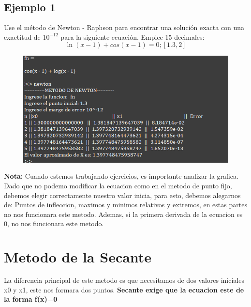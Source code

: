 \documentclass{article}
\theoremstyle{mytheoremstyle}
\theoremstyle{mytheoremstyle}
\theoremstyle{myproblemstyle}
\begin{document}
    \subsection*{Ejemplo 1}
    Use el método de Newton - Raphson para encontrar una solución exacta con una exactitud de $10^{-12}$ para la siguiente ecuación. Emplee 15 decimales: 
    \[
        \ln(x-1)+cos(x-1)=0 ; [1.3,2]
    \]
    \begin{figure}[ht]
        \includegraphics*[scale=0.9]{img/ejemplo3.png}
    \end{figure}
    
    \textbf{Nota:} Cuando estemos trabajando ejercicios, es importante analizar la grafica. Dado que no podemo modificar la ecuacion como en el metodo de punto fijo, debemos elegir correctamente nuestro valor inicia,
    para esto, debemos alegarnos de: Puntos de infleccion, maximos y minimos relativos y extremos, en estas partes no nos funcionara este metodo.
    Ademas, si la primera derivada de la ecuacion es 0, no nos funcionara este metodo.
\pagebreak
\section*{Metodo de la Secante}
La diferencia principal de este metodo es que necesitamos de dos valores iniciales x0 y x1, este nos formara dos puntos.  \textbf{Secante exige que la ecuacion
este de la forma f(x)=0}
\end{document}

